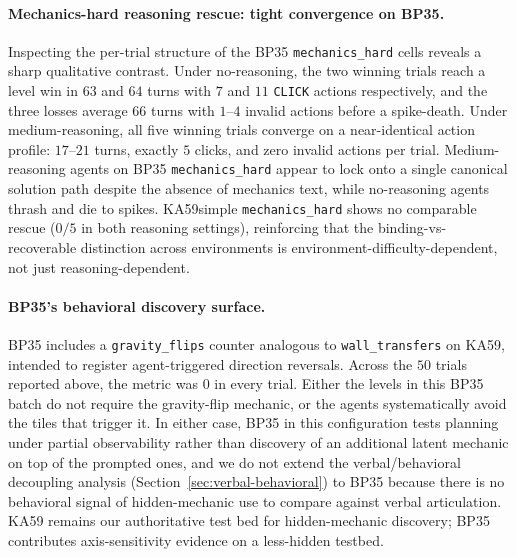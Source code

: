 \documentclass{article}
\begin{document}
\paragraph{Mechanics-hard reasoning rescue: tight convergence on BP35.}
Inspecting the per-trial structure of the BP35 \texttt{mechanics\_hard} cells reveals a sharp qualitative contrast. Under no-reasoning, the two winning trials reach a level win in $63$ and $64$ turns with $7$ and $11$ \texttt{CLICK} actions respectively, and the three losses average $66$ turns with $1$--$4$ invalid actions before a spike-death. Under medium-reasoning, all five winning trials converge on a near-identical action profile: $17$--$21$ turns, exactly $5$ clicks, and zero invalid actions per trial. Medium-reasoning agents on BP35 \texttt{mechanics\_hard} appear to lock onto a single canonical solution path despite the absence of mechanics text, while no-reasoning agents thrash and die to spikes. KA59simple \texttt{mechanics\_hard} shows no comparable rescue ($0/5$ in both reasoning settings), reinforcing that the binding-vs-recoverable distinction across environments is environment-difficulty-dependent, not just reasoning-dependent.

\paragraph{BP35's behavioral discovery surface.}
BP35 includes a \texttt{gravity\_flips} counter analogous to \texttt{wall\_transfers} on KA59, intended to register agent-triggered direction reversals. Across the $50$ trials reported above, the metric was $0$ in every trial. Either the levels in this BP35 batch do not require the gravity-flip mechanic, or the agents systematically avoid the tiles that trigger it. In either case, BP35 in this configuration tests planning under partial observability rather than discovery of an additional latent mechanic on top of the prompted ones, and we do not extend the verbal/behavioral decoupling analysis (Section~\ref{sec:verbal-behavioral}) to BP35 because there is no behavioral signal of hidden-mechanic use to compare against verbal articulation. KA59 remains our authoritative test bed for hidden-mechanic discovery; BP35 contributes axis-sensitivity evidence on a less-hidden testbed.
\end{document}
